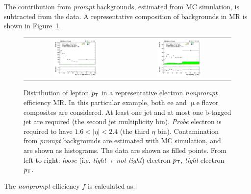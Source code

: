 The contribution from \emph{prompt} backgrounds, estimated from \ac{MC} simulation, is subtracted from the data. A representative composition of backgrounds in \ac{MR} is shown in Figure~\ref{fig:MRexample}. 

\begin{figure}[tbh!]
 \begin{center}
 \begin{tabular}{cc}
 \includegraphics[width=0.45\textwidth]{figures/Part3/Nonprompt/MR/FlepPt}&
 \includegraphics[width=0.45\textwidth]{figures/Part3/Nonprompt/MR/TlepPt} \\
 \end{tabular}
 \caption{Distribution of lepton $p_{\textsf{T}}$ in a representative electron \emph{nonprompt} efficiency \ac{MR}. In this particular example, both ee and $\upmu$e flavor composites are considered. At least one jet and at most one b-tagged jet are required (the second jet multiplicity bin). \emph{Probe} electron is required to have $1.6<|\eta|<2.4$ (the third $\eta$ bin). Contamination from \emph{prompt} backgrounds are estimated with \ac{MC} simulation, and are shown as histograms. The data are shown as filled points. From left to right: \emph{loose} (i.e. \emph{tight + not tight}) electron $p_{\textsf{T}}$, \emph{tight} electron $p_{\textsf{T}}$.}
 \label{fig:MRexample}
 \end{center}
\end{figure}

The \emph{nonprompt} efficiency $f$ is calculated as:

